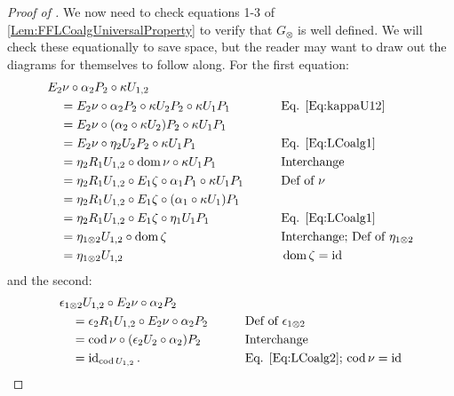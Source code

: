 \begin{proof}[Proof of ]
	We now need to check equations 1-3 of \cref{Lem:FFLCoalgUniversalProperty} to verify that $G_{\otimes}$ is well defined. We will check these equationally to save space, but the reader may want to draw out the diagrams for themselves to follow along. For the first equation:
	\begin{alignat*}{2}
		\hspace{1em}&\hspace{-1em} E_2\nu \circ \alpha_2P_2 \circ \kappa U_{1,2} && \\
		&= E_2\nu \circ \alpha_2P_2 \circ \kappa U_2P_2 \circ \kappa U_1P_1 
			&& \text{Eq. \eqref{Eq:kappaU12}} \\
		&= E_2\nu \circ (\alpha_2\circ\kappa U_2)P_2 \circ \kappa U_1P_1 && \\
		&= E_2\nu \circ \eta_2U_2P_2 \circ \kappa U_1P_1 
			&& \text{Eq. \eqref{Eq:LCoalg1}} \\
		&= \eta_2R_1U_{1,2} \circ \operatorname{dom}\nu \circ \kappa U_1P_1 
			&& \text{Interchange} \\
		&= \eta_2R_1U_{1,2} \circ E_1\zeta \circ \alpha_1P_1 \circ \kappa U_1P_1 
			&\qquad& \text{Def of $\nu$} \\
		&= \eta_2R_1U_{1,2} \circ E_1\zeta \circ (\alpha_1\circ\kappa U_1)P_1 && \\
		&= \eta_2R_1U_{1,2} \circ E_1\zeta \circ \eta_1U_1P_1 
			&&\text{Eq. \eqref{Eq:LCoalg1}} \\
		&= \eta_{1\otimes 2}U_{1,2} \circ \operatorname{dom}\zeta 
			&&\text{Interchange; Def of $\eta_{1\otimes 2}$} \\
		&= \eta_{1\otimes 2}U_{1,2} 
			&&\operatorname{dom}\zeta=\operatorname{id}
	\end{alignat*}
	and the second:
	\begin{alignat*}{2}
		\hspace{1em}&\hspace{-1em} \epsilon_{1\otimes 2}U_{1,2} \circ E_2\nu \circ \alpha_2P_2 && \\
		&= \epsilon_2R_1U_{1,2} \circ E_2\nu \circ \alpha_2P_2  
			&& \text{Def of $\epsilon_{1\otimes2}$} \\
		&= \operatorname{cod}\nu \circ (\epsilon_2U_2\circ\alpha_2)P_2 
			&\qquad& \text{Interchange} \\
		&= \operatorname{id}_{\operatorname{cod} U_{1,2}}. 
			&&\text{Eq. \eqref{Eq:LCoalg2}; $\operatorname{cod}\nu=\operatorname{id}$}
	\end{alignat*}


\end{proof}
